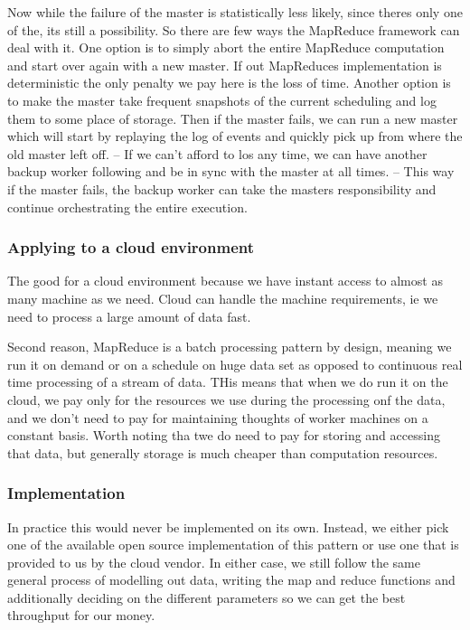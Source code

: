 \documentclass[a4paper, 11pt]{book}
\begin{document}
    Now while the failure of the master is statistically less likely, since theres only one of the, its still a possibility.
    So there are few ways the MapReduce framework can deal with it.
    One option is to simply abort the entire MapReduce computation and start over again with a new master.
    If out MapReduces implementation is deterministic the only penalty we pay here is the loss of time.
    Another option is to make the master take frequent snapshots of the current scheduling and log them to some place of storage.
    Then if the master fails, we can run a new master which will start by replaying the log of events and quickly pick up from where the old master left off.
    -- If we can't afford to los any time, we can have another backup worker following and be in sync with the master at all times.
    -- This way if the master fails, the backup worker can take the masters responsibility and continue orchestrating the entire execution.

    \subsubsection{Applying to a cloud environment}
    The good for a cloud environment because we have instant access to almost as many machine as we need.
    Cloud can handle the machine requirements, ie we need to process a large amount of data fast.

    Second reason, MapReduce is a batch processing pattern by design, meaning we run it on demand or on a schedule on huge data set as opposed to continuous real time processing of a stream of data.
    THis means that when we do run it on the cloud, we pay only for the resources we use during the processing onf the data, and we don't need to pay for maintaining thoughts of worker machines on a constant basis.
    Worth noting tha twe do need to pay for storing and accessing that data, but generally storage is much cheaper than computation resources.

    \subsubsection{Implementation}
    In practice this would never be implemented on its own.
    Instead, we either pick one of the available open source implementation of this pattern or use one that is provided to us by the cloud vendor.
    In either case, we still follow the same general process of modelling out data, writing the map and reduce functions and additionally deciding on the different parameters so we can get the best throughput for our money.
\end{document}
